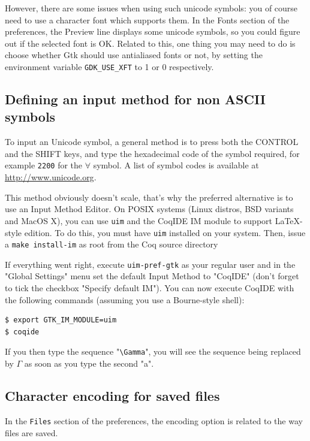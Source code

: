 However, there are some issues when using such unicode symbols: you of
course need to use a character font which supports them. In the Fonts
section of the preferences, the Preview line displays some unicode symbols, so
you could figure out if the selected font is OK. Related to this, one
thing you may need to do is choose whether Gtk should use antialiased
fonts or not, by setting the environment variable \verb|GDK_USE_XFT|
to 1 or 0 respectively.

\subsection{Defining an input method for non ASCII symbols}

To input an Unicode symbol, a general method is to press both the
CONTROL and the SHIFT keys, and type the hexadecimal code of the
symbol required, for example \verb|2200| for the $\forall$ symbol.
A list of symbol codes is available at \url{http://www.unicode.org}. 

This method obviously doesn't scale, that's why the preferred alternative is to
use an Input Method Editor. On POSIX systems (Linux distros, BSD variants and
MacOS X), you can use \texttt{uim} and the CoqIDE IM module to support \LaTeX{}-style
edition. To do this, you must have \texttt{uim} installed on your system.
Then, issue a \texttt{make install-im} as root from the Coq source directory

If everything went right, execute \texttt{uim-pref-gtk} as your regular user
and in the "Global Settings" menu set the default Input Method to "CoqIDE"
(don't forget to tick the checkbox "Specify default IM").  You can now execute
CoqIDE with the following commands (assuming you use a Bourne-style shell):

\begin{verbatim}
$ export GTK_IM_MODULE=uim
$ coqide
\end{verbatim}

If you then type the sequence "\verb=\Gamma=", you will see the sequence being
replaced by $\Gamma$ as soon as you  type the second "a".

\subsection[Character encoding for saved files]{Character encoding for saved files\label{sec:coqidecharencoding}}

In the \texttt{Files} section of the preferences, the encoding option
is related to the way files are saved. 

